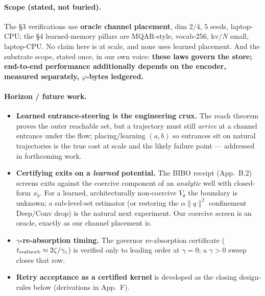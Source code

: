 \documentclass[11pt]{article}
\begin{document}
\paragraph{Scope (stated, not buried).} The \S3 verifications use \textbf{oracle channel placement}, dim $2$/$4$, $5$ seeds, laptop-CPU; the \S4 learned-memory pillars are MQAR-style, vocab-$256$, kv/$N$ small, laptop-CPU. No claim here is at scale, and none uses learned placement. And the substrate scope, stated once, in our own voice: \textbf{these laws govern the store; end-to-end performance additionally depends on the encoder, measured separately, $\varphi$-bytes ledgered.}

\paragraph{Horizon / future work.}
\begin{itemize}\itemsep1pt
\item \textbf{Learned entrance-steering is the engineering crux.} The reach theorem proves the outer reachable set, but a trajectory must still \emph{arrive} at a channel entrance under the flow; placing/learning $(a,b)$ so entrances sit on natural trajectories is the true cost at scale and the likely failure point --- addressed in forthcoming work.
\item \textbf{Certifying exits on a \emph{learned} potential.} The BIBO receipt (App.~B.2) screens exits against the coercive component of an \emph{analytic} well with closed-form $x_b$. For a learned, architecturally non-coercive $V_\theta$ the boundary is unknown; a sub-level-set estimator (or restoring the $\alpha\|q\|^2$ confinement Deep/Conv drop) is the natural next experiment. Our coercive screen is an oracle, exactly as our channel placement is.
\item \textbf{$\gamma$-re-absorption timing.} The governor re-absorption certificate ($t_{\rm reabsorb}\approx2\zeta/\gamma_c$) is verified only to leading order at $\gamma=0$; a $\gamma>0$ sweep closes that row.
\item \textbf{Retry acceptance as a certified kernel} is developed as the closing design-rules below (derivations in App.~F).
\end{itemize}
\end{document}
